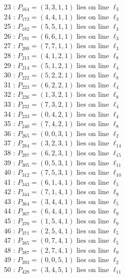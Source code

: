 \documentclass{article}
\begin{document}
{\begin{multicols}{2}
23 : $P_{164}=( 3, 3, 1, 1 )$ lies on line $\ell_{3}$\\
24 : $P_{173}=( 4, 4, 1, 1 )$ lies on line $\ell_{3}$\\
25 : $P_{182}=( 5, 5, 1, 1 )$ lies on line $\ell_{3}$\\
26 : $P_{191}=( 6, 6, 1, 1 )$ lies on line $\ell_{3}$\\
27 : $P_{200}=( 7, 7, 1, 1 )$ lies on line $\ell_{3}$\\
28 : $P_{213}=( 4, 1, 2, 1 )$ lies on line $\ell_{8}$\\
29 : $P_{214}=( 5, 1, 2, 1 )$ lies on line $\ell_{4}$\\
30 : $P_{222}=( 5, 2, 2, 1 )$ lies on line $\ell_{8}$\\
31 : $P_{223}=( 6, 2, 2, 1 )$ lies on line $\ell_{4}$\\
32 : $P_{226}=( 1, 3, 2, 1 )$ lies on line $\ell_{8}$\\
33 : $P_{232}=( 7, 3, 2, 1 )$ lies on line $\ell_{4}$\\
34 : $P_{233}=( 0, 4, 2, 1 )$ lies on line $\ell_{4}$\\
35 : $P_{240}=( 7, 4, 2, 1 )$ lies on line $\ell_{8}$\\
36 : $P_{265}=( 0, 0, 3, 1 )$ lies on line $\ell_{2}$\\
37 : $P_{284}=( 3, 2, 3, 1 )$ lies on line $\ell_{14}$\\
38 : $P_{287}=( 6, 2, 3, 1 )$ lies on line $\ell_{15}$\\
39 : $P_{305}=( 0, 5, 3, 1 )$ lies on line $\ell_{11}$\\
40 : $P_{312}=( 7, 5, 3, 1 )$ lies on line $\ell_{10}$\\
41 : $P_{343}=( 6, 1, 4, 1 )$ lies on line $\ell_{5}$\\
42 : $P_{344}=( 7, 1, 4, 1 )$ lies on line $\ell_{9}$\\
43 : $P_{364}=( 3, 4, 4, 1 )$ lies on line $\ell_{5}$\\
44 : $P_{367}=( 6, 4, 4, 1 )$ lies on line $\ell_{9}$\\
45 : $P_{370}=( 1, 5, 4, 1 )$ lies on line $\ell_{9}$\\
46 : $P_{371}=( 2, 5, 4, 1 )$ lies on line $\ell_{5}$\\
47 : $P_{385}=( 0, 7, 4, 1 )$ lies on line $\ell_{5}$\\
48 : $P_{387}=( 2, 7, 4, 1 )$ lies on line $\ell_{9}$\\
49 : $P_{393}=( 0, 0, 5, 1 )$ lies on line $\ell_{2}$\\
50 : $P_{428}=( 3, 4, 5, 1 )$ lies on line $\ell_{11}$\\

\end{multicols}}
\end{document}
